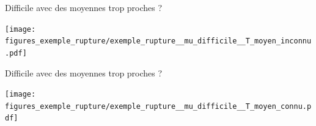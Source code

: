 \documentclass[11pt,french,ignorenonframetext,]{beamer}
\begin{document}
\begin{frame}[plain]{Difficile avec des moyennes trop proches ?}
  \begin{center}
    \texttt{[image: figures\_exemple\_rupture/exemple\_rupture\_\_mu\_difficile\_\_T\_moyen\_inconnu.pdf]}
  \end{center}
\end{frame}
\begin{frame}[plain]{Difficile avec des moyennes trop proches ?}
  \begin{center}
    \texttt{[image: figures\_exemple\_rupture/exemple\_rupture\_\_mu\_difficile\_\_T\_moyen\_connu.pdf]}
  \end{center}
\end{frame}
\end{document}
